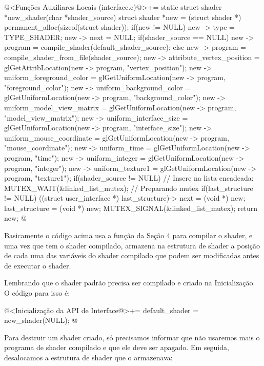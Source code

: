 \iniciocodigo
@<Funções Auxiliares Locais (interface.c)@>+=
static struct shader *new_shader(char *shader_source){
  struct shader *new = (struct shader *) permanent_alloc(sizeof(struct shader));
  if(new != NULL){
    new -> type = TYPE_SHADER;
    new -> next = NULL;
    if(shader_source == NULL)
      new -> program = compile_shader(default_shader_source);
    else
      new -> program = compile_shader_from_file(shader_source);
    new -> attribute_vertex_position = glGetAttribLocation(new -> program,
                                                           "vertex_position");
    new -> uniform_foreground_color =  glGetUniformLocation(new -> program,
                                                            "foreground_color");
    new -> uniform_background_color =  glGetUniformLocation(new -> program,
                                                            "background_color");
    new -> uniform_model_view_matrix = glGetUniformLocation(new -> program,
                                                            "model_view_matrix");
    new -> uniform_interface_size = glGetUniformLocation(new -> program,
                                                         "interface_size");
    new -> uniform_mouse_coordinate = glGetUniformLocation(new -> program,
                                                         "mouse_coordinate");
    new -> uniform_time = glGetUniformLocation(new -> program, "time");
    new -> uniform_integer = glGetUniformLocation(new -> program, "integer");
    new -> uniform_texture1 = glGetUniformLocation(new -> program, "texture1");
    if(shader_source != NULL){ // Insere na lista encadeada:
      MUTEX_WAIT(&linked_list_mutex); // Preparando mutex
      if(last_structure != NULL)
        ((struct user_interface *) last_structure)-> next = (void *) new;
      last_structure = (void *) new;
      MUTEX_SIGNAL(&linked_list_mutex);
    }
  }
  return new;
}
@
\fimcodigo

Basicamente o código acima usa a função da Seção 4 para compilar o
shader, e uma vez que tem o shader compilado, armazena na estrutura de
shader a posição de cada uma das variáveis do shader compilado que
podem ser modificadas antes de executar o shader.

Lembrando que o shader padrão precisa ser compilado e criado na
Inicialização. O código para isso é:

\iniciocodigo
@<Inicialização da API de Interface@>+=
default_shader = new_shader(NULL);
@
\fimcodigo

Para destruir um shader criado, só precisamos informar que não
usaremos mais o programa de shader compilado e que ele deve ser
apagado. Em seguida, desalocamos a estrutura de shader que o
armazenava:

